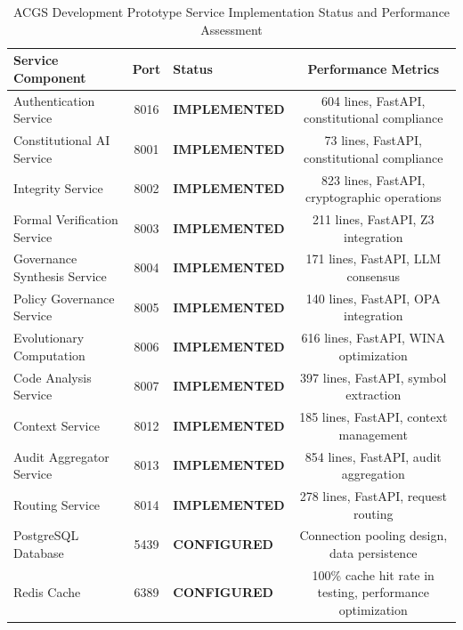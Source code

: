 \documentclass[manuscript,screen,9pt]{acmart}
\newcommand{\tablesize}{\footnotesize}
\newcommand{\tableheader}[1]{\textbf{#1}}
\begin{document}
\begin{table}[!htb]
\centering
\caption{ACGS Development Prototype Service Implementation Status and Performance Assessment}
\label{tab:implementation_status}
\tablesize
\begin{tabular}{@{}lclc@{}}
\toprule
\tableheader{Service Component} & \tableheader{Port} & \tableheader{Status} & \tableheader{Performance Metrics} \\
\midrule
Authentication Service & 8016 & \textbf{IMPLEMENTED} & 604 lines, FastAPI, constitutional compliance \\
Constitutional AI Service & 8001 & \textbf{IMPLEMENTED} & 73 lines, FastAPI, constitutional compliance \\
Integrity Service & 8002 & \textbf{IMPLEMENTED} & 823 lines, FastAPI, cryptographic operations \\
Formal Verification Service & 8003 & \textbf{IMPLEMENTED} & 211 lines, FastAPI, Z3 integration \\
Governance Synthesis Service & 8004 & \textbf{IMPLEMENTED} & 171 lines, FastAPI, LLM consensus \\
Policy Governance Service & 8005 & \textbf{IMPLEMENTED} & 140 lines, FastAPI, OPA integration \\
Evolutionary Computation & 8006 & \textbf{IMPLEMENTED} & 616 lines, FastAPI, WINA optimization \\
Code Analysis Service & 8007 & \textbf{IMPLEMENTED} & 397 lines, FastAPI, symbol extraction \\
Context Service & 8012 & \textbf{IMPLEMENTED} & 185 lines, FastAPI, context management \\
Audit Aggregator Service & 8013 & \textbf{IMPLEMENTED} & 854 lines, FastAPI, audit aggregation \\
Routing Service & 8014 & \textbf{IMPLEMENTED} & 278 lines, FastAPI, request routing \\

\midrule
PostgreSQL Database & 5439 & \textbf{CONFIGURED} & Connection pooling design, data persistence \\
Redis Cache & 6389 & \textbf{CONFIGURED} & 100\% cache hit rate in testing, performance optimization \\
\bottomrule
\end{tabular}
\end{table}
\end{document}
